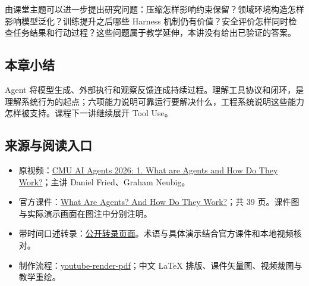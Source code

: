 \documentclass[11pt,a4paper]{article}
\begin{document}
由课堂主题可以进一步提出研究问题：压缩怎样影响约束保留？领域环境构造怎样影响模型泛化？训练提升之后哪些 Harness 机制仍有价值？安全评价怎样同时检查任务结果和行动过程？这些问题属于教学延伸，本讲没有给出已验证的答案。

\subsection{本章小结}
Agent 将模型生成、外部执行和观察反馈连成持续过程。理解工具协议和闭环，是理解系统行为的起点；六项能力说明可靠运行要解决什么，工程系统说明这些能力怎样被支持。课程下一讲继续展开 Tool Use。

\subsection{来源与阅读入口}
\begin{itemize}
\item 原视频：\href{https://www.youtube.com/watch?v=UwfjzyLnvMg}{CMU AI Agents 2026: 1. What are Agents and How Do They Work?}；主讲 Daniel Fried、Graham Neubig。
\item 官方课件：\href{https://www.cmu-agents.com/slides/lecture-01-agents.pdf}{What Are Agents? And How Do They Work?}；共 39 页。课件图与实际演示画面在图注中分别注明。
\item 带时间口述转录：\href{https://www.usetranscribe.io/yt/UwfjzyLnvMg/ai-agents-explained}{公开转录页面}。术语与具体演示结合官方课件和本地视频核对。
\item 制作流程：\href{https://github.com/wdkns/wdkns-skills/tree/main/skills/youtube-render-pdf}{youtube-render-pdf}；中文 LaTeX 排版、课件矢量图、视频裁图与教学重绘。
\end{itemize}
\end{document}
